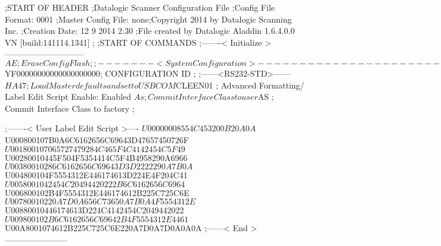 ;START OF HEADER
;Datalogic Scanner Configuration File
;Config File Format: 0001
;Master Config File: none;Copyright 2014 by Datalogic Scanning Inc.
;Creation Date: 12 9 2014 2:30
;File created by Datalogic Aladdin 1.6.4.0.0 VN [build:141114.1341]
;
;START OF COMMANDS
;-------< Initialize >-----------------------------
$AE                 ; Erase Config Flash
;
;-------< System Configuration >-------------------------------
$YF00000000000000000000; CONFIGURATION ID
;
;------<RS232-STD>------
$HA47              ; Load Master defaults and set to USBCOM
$CLEEN01            ; Advanced Formatting/ Label Edit Script Enable: Enabled
$As                 ; Commit Interface Class to user
$AS                 ; Commit Interface Class to factory
;

;-------< User Label Edit Script >----
$U00000008554C453200B20A0A
$U000800107B0A6C6162656C69643D47657450726F
$U001800107065727479284C465F4C4142454C5F49
$U00280010445F504F5354414C5F4B4958290A6966
$U00380010286C6162656C69643D3D2222290A7B0A
$U004800104F5554312E446174613D224E4F204C41
$U0058001042454C20494420222B6C6162656C6964
$U006800102B4F5554312E446174612B225C725C6E
$U00780010220A7D0A656C73650A7B0A4F5554312E
$U00880010446174613D224C4142454C2049442022
$U009800102B6C6162656C69642B4F5554312E4461
$U00A8001074612B225C725C6E220A7D0A7D0A0A0A
;------< End >-----------------------
